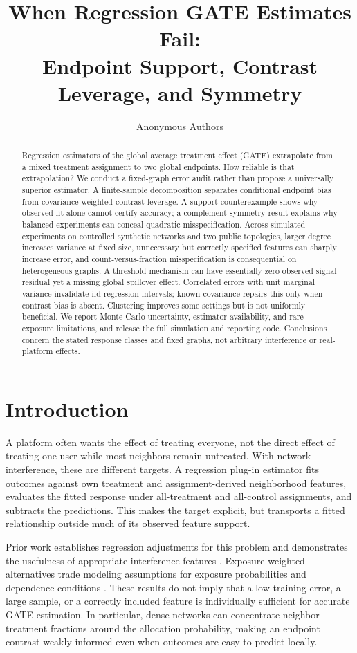 \documentclass{article}
\title{When Regression GATE Estimates Fail:\\Endpoint Support, Contrast Leverage, and Symmetry}
\author{Anonymous Authors}
\begin{document}
\maketitle
\begin{abstract}
Regression estimators of the global average treatment effect (GATE) extrapolate from a mixed treatment assignment to two global endpoints. How reliable is that extrapolation? We conduct a fixed-graph error audit rather than propose a universally superior estimator. A finite-sample decomposition separates conditional endpoint bias from covariance-weighted contrast leverage. A support counterexample shows why observed fit alone cannot certify accuracy; a complement-symmetry result explains why balanced experiments can conceal quadratic misspecification. Across \AllAssignments{} simulated experiments on controlled synthetic networks and two public topologies, larger degree increases variance at fixed size, unnecessary but correctly specified features can sharply increase error, and count-versus-fraction misspecification is consequential on heterogeneous graphs. A threshold mechanism can have essentially zero observed signal residual yet a missing global spillover effect. Correlated errors with unit marginal variance invalidate iid regression intervals; known covariance repairs this only when contrast bias is absent. Clustering improves some settings but is not uniformly beneficial. We report Monte Carlo uncertainty, estimator availability, and rare-exposure limitations, and release the full simulation and reporting code. Conclusions concern the stated response classes and fixed graphs, not arbitrary interference or real-platform effects.
\end{abstract}

\section{Introduction}
A platform often wants the effect of treating everyone, not the direct effect of treating one user while most neighbors remain untreated. With network interference, these are different targets. A regression plug-in estimator fits outcomes against own treatment and assignment-derived neighborhood features, evaluates the fitted response under all-treatment and all-control assignments, and subtracts the predictions. This makes the target explicit, but transports a fitted relationship outside much of its observed feature support.

Prior work establishes regression adjustments for this problem and demonstrates the usefulness of appropriate interference features \citep{chin,han}. Exposure-weighted alternatives trade modeling assumptions for exposure probabilities and dependence conditions \citep{aronow,ugander}. These results do not imply that a low training error, a large sample, or a correctly included feature is individually sufficient for accurate GATE estimation. In particular, dense networks can concentrate neighbor treatment fractions around the allocation probability, making an endpoint contrast weakly informed even when outcomes are easy to predict locally.
\end{document}
